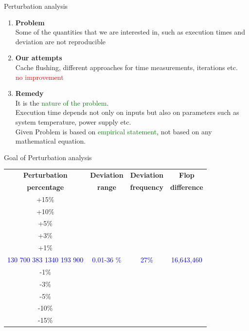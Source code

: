 \documentclass[10pts]{beamer}
\begin{document}
	   \begin{frame}[t]{Perturbation analysis }
	  
	   	
	   		\begin{enumerate}[(\roman{*})]
	   			\item \textbf{Problem} \\
	   		  Some of the quantities that we are interested in, such as execution times and deviation  are not reproducible
	   	
	   	
	   	         \item \textbf{Our attempts} \\
	   	         Cache flushing, different approaches for time measurements, iterations etc.\\
	   	         \textcolor{red}{no improvement}
	   	
	              \item \textbf{Remedy} \\
	              It is the \textcolor{green}{nature of the problem}.\\
	              Execution time depends not only on inputs but also on parameters such as system temperature, power supply etc.\\ 
	              Given Problem is based on \textcolor{green}{empirical statement}, not based on any mathematical equation.  
	              
	              
	   		\end{enumerate}
	   		
	   	
	  
	   \end{frame} 
	   
	  
	   \begin{frame}{Goal of Perturbation analysis }
	   	\begin{center}
	   		\begin{tabular}{c | c |c | c}
	   		\textbf{Perturbation} & \textbf{Deviation} & \textbf{Deviation} & \textbf{Flop }\\
	   		\textbf{percentage}& \textbf{range}&\textbf{frequency}&\textbf{difference}\\
	   		
	   		+15\%	&	 		&			&\\	
	   		+10\%	&	 		&			&  \\ 
	   		+5\%	&    		&			&	\\
	   		+3\%	&    		&			&	\\
	   		+1\%	&    	&		    &	\\
	   		\textcolor{blue}{130} \textcolor{blue}{700} \textcolor{blue}{383} \textcolor{blue}{1340} \textcolor{blue}{193} \textcolor{blue}{900}	&    \textcolor{blue}{0.01-36 \%}		&	\textcolor{blue}{27\%}		&	\textcolor{blue}{16,643,460}\\
	   		-1\%	&    		&			&	\\
	   		-3\%	&    		&			&	\\
	   		-5\%	&    		&			&	\\
	   		-10\%	& 	 		&			&	\\
	   		-15\%	&	 		&			&	\\
	   		\end{tabular}
	   	\end{center}
	   \end{frame} 
	  
\end{document}
